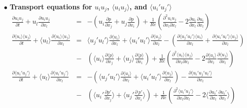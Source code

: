 \documentclass[a4paper,11pt]{article}
\begin{document}
\noindent $\bullet$  \textbf{Transport equations for $u_iu_j$, $\langle u_iu_j\rangle$, and $\langle u_i'u_j'\rangle$}
\begin{eqnarray}
\frac{\partial u_iu_j }{\partial t}
+u_l\frac{\partial u_iu_j }{\partial x_l}
&=&-(u_i\frac{\partial p }{\partial x_j}+u_j\frac{\partial p }{\partial x_i})
+\frac{1}{Re}(\frac{\partial^2 u_iu_j }{\partial x_l\partial x_l}-2\frac{\partial u_i }{\partial x_l}\frac{\partial u_i }{\partial x_l}) \\
\frac{\partial \langle u_i\rangle \langle u_j\rangle }{\partial t}
+\langle u_l\rangle \frac{\partial \langle u_i\rangle \langle u_j\rangle }{\partial x_l}
&=&\langle u_j'u_l'\rangle \frac{\partial \langle u_i \rangle}{\partial x_l}+\langle u_i'u_l'\rangle \frac{\partial \langle u_j \rangle  }{\partial x_l}
-(\frac{\partial \langle u_j'u_l'\rangle \langle u_i \rangle }{\partial x_l}+\frac{\partial \langle u_i'u_l'\rangle \langle u_j \rangle }{\partial x_l}) \nonumber \\
&-&(\langle u_i\rangle \frac{\partial \langle p\rangle }{\partial x_j}+\langle u_j \rangle \frac{\partial \langle p\rangle }{\partial x_i}) 
+ \frac{1}{Re}(\frac{\partial^2 \langle u_i\rangle \langle u_j \rangle}{\partial x_l\partial x_l}-2\frac{\partial \langle u_i\rangle }{\partial x_l} \frac{\partial \langle u_j\rangle }{\partial x_l}) \\
\frac{\partial \langle u_i'u_j'\rangle }{\partial t}
+\langle u_l\rangle \frac{\partial \langle u_i'u_j'\rangle }{\partial x_l}
&=&-(\langle u_j'u_l'\rangle \frac{\partial \langle u_i \rangle  }{\partial x_l}
+\langle u_i'u_l'\rangle \frac{\partial \langle u_j \rangle  }{\partial x_l})
-\frac{\partial \langle u_i'u_j'u_l'\rangle}{\partial x_l}  \nonumber \\
&-&(\langle u_i' \frac{\partial  p' }{\partial x_j}\rangle +\langle u_j' \frac{\partial \ p' }{\partial x_i}\rangle) 
+\frac{1}{Re}(\frac{\partial^2 \langle u_i'u_j' \rangle}{\partial x_l\partial x_l}-2\langle \frac{\partial  u_i' }{\partial x_l}\frac{\partial  u_i' }{\partial x_l}\rangle)
\end{eqnarray}
\end{document}
